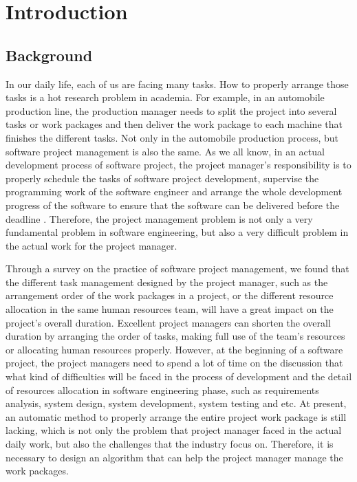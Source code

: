 
\section{Introduction}

\subsection{Background}
%
In our daily life, each of us are facing many tasks. How to properly arrange
those tasks is a hot research problem in academia. For example, in an automobile
production line, the production manager needs to split the project into several
tasks or work packages and then deliver the work package to each machine that
finishes the different tasks. Not only in the automobile production process, but
software project management is also the same. As we all know, in an actual
development process of software project, the project manager's responsibility is
to properly schedule the tasks of software project development, supervise the
programming work of the software engineer and arrange the whole development
progress of the software to ensure that the software can be delivered before the
deadline \cite{stellman}. Therefore, the project management problem is not only
a very fundamental problem in software engineering, but also a very difficult
problem in the actual work for the project manager.


Through a survey on the practice of software project management, we found 
that the different task management designed by the project manager, such as 
the arrangement order of the work packages in a project, or the different 
resource allocation in the same human resources team, will have a great 
impact on the project's overall duration. Excellent project managers can 
shorten the overall duration by arranging the order of tasks, making full use 
of the team’s resources or allocating human resources properly. However, at 
the beginning of a software project, the project managers need to spend a lot 
of time on the discussion that what kind of difficulties will be faced in the 
process of development and the detail of resources allocation in 
software engineering phase, such as requirements analysis, system design, 
system development, system testing and etc. At present, an automatic method 
to properly arrange the entire project work package is still lacking, which 
is not only the problem that project manager faced in the actual daily work, 
but also the challenges that the industry focus on. Therefore, it is 
necessary to design an algorithm that can help the project manager manage the 
work packages.


